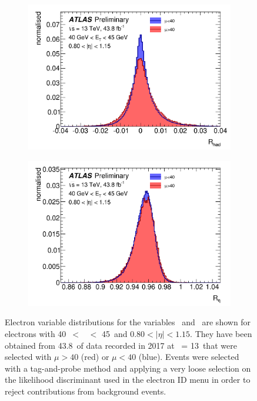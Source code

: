 \begin{figure}[h]
  \centering
    \begin{subfigure}[b]{0.49\textwidth}
      \centering
      \includegraphics[width=1.02\textwidth]{figs/egamma/rhad_hilomu.png}
      \caption{}
      \label{fig:egamma:rhad_hilomu}
    \end{subfigure}
    \hfill
    \begin{subfigure}[b]{0.49\textwidth}
      \centering
      \includegraphics[width=1.02\textwidth]{figs/egamma/rphi_hilomu.png}
      \caption{}
      \label{fig:egamma:rphi_hilomu}
    \end{subfigure}
    \caption[Electron variable distributions \rhad\ and \reta\ showing high pileup's  effect on the shapes of the distributions]{Electron variable distributions for the variables \rhad\ and \reta\ are shown for electrons with 40~\GeV $<$ \et\ $<$ 45~\GeV and $0.80 < |\eta| < 1.15$.
    They have been obtained from 43.8~\ifb of data recorded in 2017 at \rts\ = 13~\TeV that were selected with $\mu >40$ (red) or $\mu<40$ (blue).
    Events were selected with a tag-and-probe method and applying a very loose selection on the likelihood discriminant used in the electron ID menu in order to reject contributions from background events.}
\label{fig:egamma:rhadretahimu}
\end{figure}
